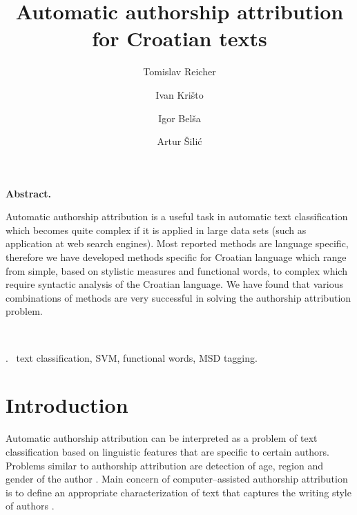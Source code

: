 \documentclass[11pt,english]{article}
\let\LaTeXtitle\title
\renewcommand{\title}[1]{\LaTeXtitle{\Large \textbf{#1}}}
\renewenvironment{abstract}
{\noindent \large \bf Abstract. \normalsize \begin{it}}
{\end{it}\\}
\newenvironment{keywords}
{\noindent {\large {\bf Keywords}}.~}{}
\begin{document}
\title{Automatic authorship attribution for Croatian texts}
\author{Tomislav Reicher}
\author{Ivan Krišto}
\author{Igor Belša}
\author{Artur Šilić}

\date{}

\maketitle

\thispagestyle{empty}
\pagestyle{empty}
\begin{multicols}{2}


\begin{abstract}
Automatic authorship attribution is a useful task in automatic text
classification which becomes quite complex if it is applied in large data sets
(such as application at web search engines). Most reported methods are language
specific, therefore we have developed methods specific for Croatian language
which range from simple, based on stylistic measures and functional words, to
complex which require syntactic analysis of the Croatian language. We have found
that various combinations of methods are very successful in solving the
authorship attribution problem.
\end{abstract}

\begin{keywords}
text classification, SVM, functional words, MSD tagging.
\end{keywords}

\section{Introduction}
Automatic authorship attribution can be interpreted as a problem of text
classification based on linguistic features that are specific to certain authors. Problems similar to authorship
attribution are detection of age, region and gender of the author
\citep{luyckx2005shallow}. Main concern of computer--assisted authorship
attribution is to define an appropriate characterization of text that
captures the writing style of authors \citep{coyotl2006authorship}.



\end{multicols}
\end{document}
